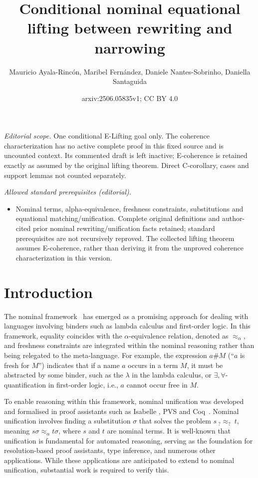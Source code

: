 \documentclass[11pt,a4paper]{amsart}
\title{Conditional nominal equational lifting between rewriting and narrowing}
\author{Mauricio Ayala-Rincón, Maribel Fernández, Daniele Nantes-Sobrinho, Daniella Santaguida}
\date{arxiv:2506.05835v1; CC BY 4.0}
\newcommand{\aleq}{\approx_{\alpha}}
\theoremstyle{plain}
\theoremstyle{definition}
\theoremstyle{remark}
\begin{document}
\maketitle
\noindent\textit{Editorial scope.} One conditional E-Lifting goal only. The coherence characterization has no active complete proof in this fixed source and is uncounted context. Its commented draft is left inactive; E-coherence is retained exactly as assumed by the original lifting theorem. Direct C-corollary, cases and support lemmas not counted separately.\par\medskip
\noindent\textit{Allowed standard prerequisites (editorial).}\begin{itemize}
\item Nominal terms, alpha-equivalence, freshness constraints, substitutions and equational matching/unification. Complete original definitions and author-cited prior nominal rewriting/unification facts retained; standard prerequisites are not recursively reproved. The collected lifting theorem assumes E-coherence, rather than deriving it from the unproved coherence characterization in this version.
\end{itemize}\medskip
\section{Introduction}

The nominal framework~\cite{VarBinding/GabbayP02} has emerged as a promising approach for dealing with languages involving binders such as lambda calculus and first-order logic.  In this framework,
equality coincides with the $\alpha$-equivalence relation, denoted as $\aleq$, and freshness constraints are integrated within the nominal reasoning rather than being relegated to the meta-language. For example, the expression  $a\# M$  (``$a$ is fresh for $M$'') indicates that if a name $a$ occurs in a term $M$, it must be abstracted by some binder, such as the $\lambda$ in the lambda calculus, or $\exists,\forall$-quantification in first-order logic, i.e., $a$  cannot occur free in $M$. 



To enable reasoning within this framework, 
nominal  unification \cite{Matching/jcss/CalvesF10,NomUnification/UrbanPG04} was developed and  formalised in proof assistants such as Isabelle \cite{NomUnification/UrbanPG04}, PVS \cite{entcs:PVS/AnaCristina16} and Coq~\cite{A-C-AC/tcs/Ayala-RinconSFN19}. Nominal unification involves finding a substitution $\sigma$ that solves the problem $s\ _?{\overset{}{\approx}}_?\ t$, meaning $s\sigma\aleq t\sigma$, where $s$ and $t$ are nominal terms.  It is well-known that unification is fundamental for automated reasoning, serving as the foundation for resolution-based proof assistants, type inference, and numerous other applications. While these applications are anticipated to extend to nominal unification, substantial work is required to verify this. 
\end{document}
